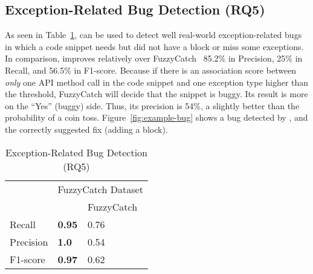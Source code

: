 \subsection{Exception-Related Bug Detection (RQ5)}
\label{sec:rq1}





As seen in Table~\ref{tab:bug}, {\tool} can be used to detect well
real-world exception-related bugs in which a code snippet needs but
did not have a  block or miss some exceptions. In
comparison, {\tool} improves relatively over
FuzzyCatch~\cite{xrank-fse20} 85.2\% in Precision, 25\% in Recall, and
56.5\% in F1-score.
Because if there is an association score between {\em only} one API
method call in the code snippet and one exception type higher than the
threshold, FuzzyCatch will decide that the snippet is buggy. Its
result is more on the ``Yes'' (buggy) side. Thus, its precision is
54\%, a slightly better than the probability of a coin
toss. Figure~\ref{fig:example-bug} shows a bug detected by {\tool},
and the correctly suggested fix (adding a  block).


\begin{table}[t]%
  \caption {Exception-Related Bug Detection (RQ5)}
  \vspace{-12pt}
  \small
	\begin{center}
		\renewcommand{\arraystretch}{1}
		\begin{tabular}{|p{1.75cm}<{\centering}|p{1.75cm}<{\centering}|p{1.75cm}<{\centering}|}
		  \hline
			\multirow{2}{*}{} & \multicolumn{2}{c|}{FuzzyCatch Dataset} \\
			\cline{2-3}
			  & \tool  & FuzzyCatch~\cite{xrank-fse20} \\
			\hline
			Recall    & \textbf{0.95}& 0.76\\
			Precision & \textbf{1.0} & 0.54\\
			F1-score   & \textbf{0.97} & 0.62\\
			\hline
		\end{tabular}
		\label{tab:bug}
	\end{center}
\end{table}

%


